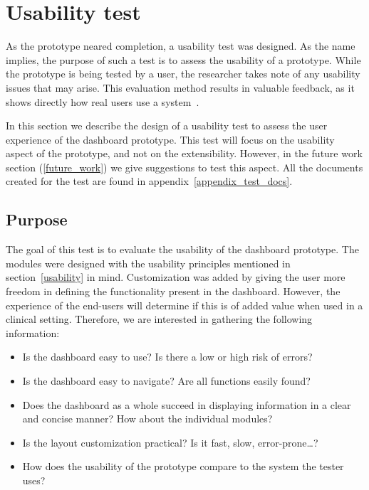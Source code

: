 \section{Usability test}\label{usabilitytest}

As the prototype neared completion, a usability test was designed. As the name implies, the purpose of such a test is to assess the usability of a prototype. While the prototype is being tested by a user, the researcher takes note of any usability issues that may arise. This evaluation method results in valuable feedback, as it shows directly how real users use a system~\cite{Nielsen1993}.

In this section we describe the design of a usability test to assess the user experience of the dashboard prototype. This test will focus on the usability aspect of the prototype, and not on the extensibility. However, in the future work section (\ref{future_work}) we give suggestions to test this aspect. All the documents created for the test are found in appendix~\ref{appendix_test_docs}.

    \subsection{Purpose}

    The goal of this test is to evaluate the usability of the dashboard prototype. The modules were designed with the usability principles mentioned in section~\ref{usability} in mind. Customization was added by giving the user more freedom in defining the functionality present in the dashboard. However, the experience of the end-users will determine if this is of added value when used in a clinical setting. Therefore, we are interested in gathering the following information:
    \begin{itemize}
        \item Is the dashboard easy to use? Is there a low or high risk of errors?
        \item Is the dashboard easy to navigate? Are all functions easily found?
        \item Does the dashboard as a whole succeed in displaying information in a clear and concise manner? How about the individual modules?
        \item Is the layout customization practical? Is it fast, slow, error-prone\ldots?
        \item How does the usability of the prototype compare to the system the tester uses?
    \end{itemize}

